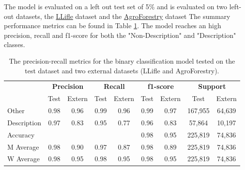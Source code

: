 \documentclass[a4paper, 12pt, oneside]{book} %
\begin{document}
The model is evaluated on a left out test set of 5\% and is evaluated on two left-out datasets, the \href{http://www.llifle.com/}{LLifle} dataset and the \href{https://www.worldagroforestry.org/}{AgroForestry} dataset
The summary performance metrics can be found in Table \ref{tab:precision_recall_metrics}.
The model reaches an high precision, recall and f1-score for both the "Non-Description" and "Description" classes.
\begin{table}[ht]
\centering
\caption[Precision-recall metrics test and two left out datasets]{The precision-recall metrics for the binary classification model tested on the test dataset and two external datasets (LLifle and AgroForestry).}
\label{tab:precision_recall_metrics}
\begin{tabular}{@{}lcccccccc@{}}
\cmidrule(l){2-9}
 & \multicolumn{2}{c}{\textbf{Precision}} & \multicolumn{2}{c}{\textbf{Recall}} & \multicolumn{2}{c}{\textbf{f1-score}} & \multicolumn{2}{c}{\textbf{Support}} \\ \cmidrule(l){2-9} 
                 & Test & Extern & Test & Extern & Test & Extern & Test    & Extern \\ \midrule
Other            & 0.98 & 0.96   & 0.99 & 0.96   & 0.99 & 0.97   & 167,955 & 64,639 \\
Description      & 0.97 & 0.83   & 0.95 & 0.77   & 0.96 & 0.83   & 57,864  & 10,197  \\ \midrule
Accuracy         &      &        &      &        & 0.98 & 0.95   & 225,819 & 74,836 \\
M Average        & 0.98 & 0.90   & 0.97 & 0.87   & 0.98 & 0.89   & 225,819 & 74,836 \\
W Average        & 0.98 & 0.95   & 0.98 & 0.95   & 0.98 & 0.95   & 225,819 & 74,836 \\ \bottomrule
\end{tabular}
\end{table}
\end{document}
